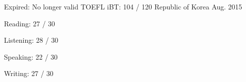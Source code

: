 \begin{cventries}
  \cventry
    {Expired: No longer valid} %
    {TOEFL iBT: 104 / 120} %
    {Republic of Korea} %
    {Aug. 2015} %
    {
      \begin{cvitems} %
        \item {Reading: 27 / 30}
        \item {Listening: 28 / 30}
        \item {Speaking: 22 / 30}
        \item {Writing: 27 / 30}
      \end{cvitems}
    }


\end{cventries}
